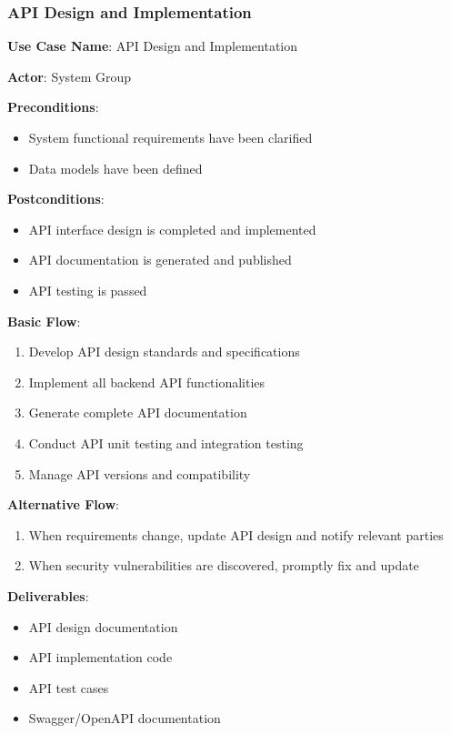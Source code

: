 \documentclass[a4paper,12pt]{article}
\begin{document}
\subsubsection{API Design and Implementation}

\textbf{Use Case Name}: API Design and Implementation

\textbf{Actor}: System Group

\textbf{Preconditions}:
\begin{itemize}
  \item System functional requirements have been clarified
  \item Data models have been defined
\end{itemize}

\textbf{Postconditions}:
\begin{itemize}
  \item API interface design is completed and implemented
  \item API documentation is generated and published
  \item API testing is passed
\end{itemize}

\textbf{Basic Flow}:
\begin{enumerate}
  \item Develop API design standards and specifications
  \item Implement all backend API functionalities
  \item Generate complete API documentation
  \item Conduct API unit testing and integration testing
  \item Manage API versions and compatibility
\end{enumerate}

\textbf{Alternative Flow}:
\begin{enumerate}
  \item When requirements change, update API design and notify relevant parties
  \item When security vulnerabilities are discovered, promptly fix and update
\end{enumerate}

\textbf{Deliverables}:
\begin{itemize}
  \item API design documentation
  \item API implementation code
  \item API test cases
  \item Swagger/OpenAPI documentation
\end{itemize}
\end{document}
